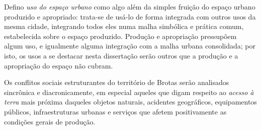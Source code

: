Defino \textit{uso do espaço urbano} como algo além da simples fruição do espaço urbano produzido e apropriado: trata-se de usá-lo de forma integrada com outros usos da mesma cidade, integrando todos eles numa malha simbólica e prática comum, estabelecida sobre o espaço produzido. Produção e apropriação pressupõem algum uso, e igualmente alguma integração com a malha urbana consolidada; por isto, os usos a se destacar nesta dissertação serão outros que a produção e a apropriação do espaço não cubram.

Os conflitos sociais estruturantes do território de Brotas serão analisados sincrônica e diacronicamente, em especial aqueles que digam respeito ao \textit{acesso à terra} mais próxima daqueles objetos naturais, acidentes geográficos, equipamentos públicos, infraestruturas urbanas e serviços que afetem positivamente as condições gerais de produção. 

